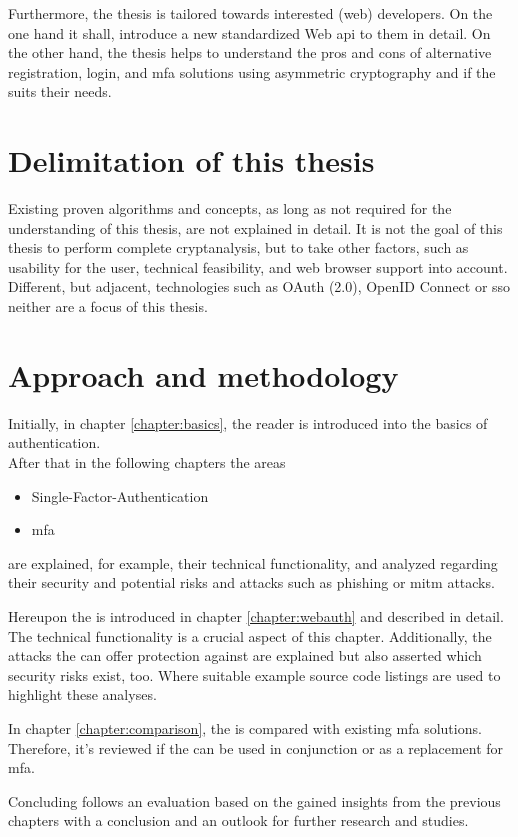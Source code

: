 Furthermore, the thesis is tailored towards interested (web) developers. On the one hand it shall, introduce a new standardized Web \gls{api} to them in detail. On the other hand, the thesis helps to understand the pros and cons of alternative registration, login, and \gls{mfa} solutions using asymmetric cryptography and if the \wa{} suits their needs.

\section{Delimitation of this thesis}

Existing proven algorithms and concepts, as long as not required for the understanding of this thesis, are not explained in detail. It is not the goal of this thesis to perform complete cryptanalysis, but to take other factors, such as usability for the user, technical feasibility, and web browser support into account. Different, but adjacent, technologies such as OAuth (2.0), OpenID Connect or \gls{sso} neither are a focus of this thesis.

\section{Approach and methodology}

Initially, in chapter \ref{chapter:basics}, the reader is introduced into the basics of authentication.\\
After that in the following chapters the areas

\begin{itemize}
	\item Single-Factor-Authentication
	\item \gls{mfa}
\end{itemize}

are explained, for example, their technical functionality, and analyzed regarding their security and potential risks and attacks such as phishing or \gls{mitm} attacks.

Hereupon the \wa{} is introduced in chapter \ref{chapter:webauth} and described in detail. The technical functionality is a crucial aspect of this chapter. Additionally, the attacks the \wa{} can offer protection against are explained but also asserted which security risks exist, too. Where suitable example source code listings are used to highlight these analyses.%

In chapter \ref{chapter:comparison}, the \wa{} is compared with existing \gls{mfa} solutions. Therefore, it's reviewed if the \wa{} can be used in conjunction or as a replacement for \gls{mfa}.

Concluding follows an evaluation based on the gained insights from the previous chapters with a conclusion and an outlook for further research and studies.
